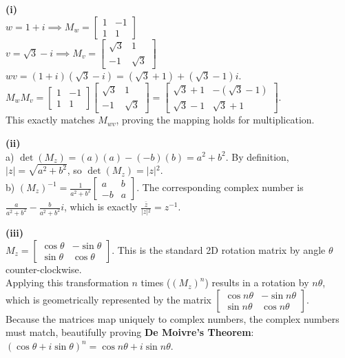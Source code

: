 \begin{solution}
\textbf{(i)} \\
$w = 1+i \implies M_w = \begin{bmatrix} 1 & -1 \\ 1 & 1 \end{bmatrix}$ \\
$v = \sqrt{3}-i \implies M_v = \begin{bmatrix} \sqrt{3} & 1 \\ -1 & \sqrt{3} \end{bmatrix}$ \\
$wv = (1+i)(\sqrt{3}-i) = (\sqrt{3}+1) + (\sqrt{3}-1)i$. \\
$M_w M_v = \begin{bmatrix} 1 & -1 \\ 1 & 1 \end{bmatrix} \begin{bmatrix} \sqrt{3} & 1 \\ -1 & \sqrt{3} \end{bmatrix} = \begin{bmatrix} \sqrt{3}+1 & -(\sqrt{3}-1) \\ \sqrt{3}-1 & \sqrt{3}+1 \end{bmatrix}$. \\
This exactly matches $M_{wv}$, proving the mapping holds for multiplication.

\medskip
\textbf{(ii)} \\
a) $\det(M_z) = (a)(a) - (-b)(b) = a^2 + b^2$. By definition, $\vert{}z\vert{} = \sqrt{a^2+b^2}$, so $\det(M_z) = \vert{}z\vert{}^2$. \\
b) $(M_z)^{-1} = \frac{1}{a^2+b^2} \begin{bmatrix} a & b \\ -b & a \end{bmatrix}$. The corresponding complex number is $\frac{a}{a^2+b^2} - \frac{b}{a^2+b^2}i$, which is exactly $\frac{\bar{z}}{\vert{}z\vert{}^2} = z^{-1}$.

\medskip
\textbf{(iii)} \\
$M_z = \begin{bmatrix} \cos\theta & -\sin\theta \\ \sin\theta & \cos\theta \end{bmatrix}$. This is the standard 2D rotation matrix by angle $\theta$ counter-clockwise. \\
Applying this transformation $n$ times ($(M_z)^n$) results in a rotation by $n\theta$, which is geometrically represented by the matrix $\begin{bmatrix} \cos n\theta & -\sin n\theta \\ \sin n\theta & \cos n\theta \end{bmatrix}$. \\
Because the matrices map uniquely to complex numbers, the complex numbers must match, beautifully proving \textbf{De Moivre's Theorem}: $(\cos\theta + i\sin\theta)^n = \cos n\theta + i\sin n\theta$.


\end{solution}
